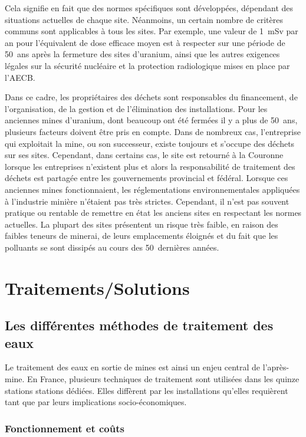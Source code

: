 \documentclass{article}
\begin{document}
Cela signifie en fait que des normes spécifiques sont développées, dépendant des situations actuelles de chaque site. Néanmoins, un certain nombre de critères communs sont applicables à tous les sites. Par exemple, une valeur de 1~mSv par an pour l'équivalent de dose efficace moyen est à respecter sur une période de 50~ans après la fermeture des sites d'uranium, ainsi que les autres exigences légales sur la sécurité nucléaire et la protection radiologique mises en place par l'AECB.

Dans ce cadre, les propriétaires des déchets sont responsables du financement, de l'organisation, de la gestion et de l’élimination des installations. Pour les anciennes mines d'uranium, dont beaucoup ont été fermées il y a plus de 50~ans, plusieurs facteurs doivent être pris en compte. Dans de nombreux cas, l'entreprise qui exploitait la mine, ou son successeur, existe toujours et s'occupe des déchets sur ses sites. Cependant, dans certains cas, le site est retourné à la Couronne lorsque les entreprises n’existent plus et alors la responsabilité de traitement des déchets est partagée entre les gouvernements provincial et fédéral. Lorsque ces anciennes mines fonctionnaient, les réglementations environnementales appliquées à l'industrie minière n'étaient pas très strictes. Cependant, il n'est pas souvent pratique ou rentable de remettre en état les anciens sites en respectant les normes actuelles. La plupart des sites présentent un risque très faible, en raison des faibles teneurs de minerai, de leurs emplacements éloignés et du fait que les polluants se sont dissipés au cours des 50~dernières années.

\newpage
\section{Traitements/Solutions}
\subsection{Les différentes méthodes de traitement des eaux}
Le traitement des eaux en sortie de mines est ainsi un enjeu central de l’après-mine. En France, plusieurs techniques de traitement sont utilisées dans les quinze stations stations dédiées. Elles diffèrent par les installations qu’elles requièrent tant que par leurs implications socio-économiques.

\subsubsection{Fonctionnement et coûts}
\end{document}
